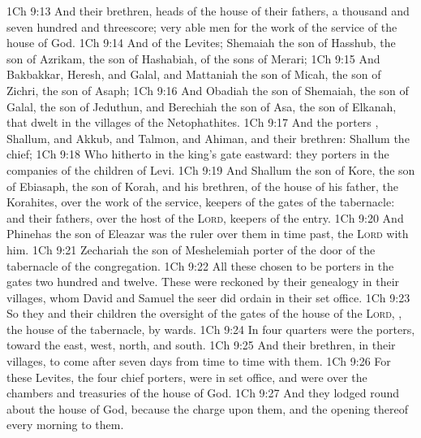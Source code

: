 \vs 1Ch 9:13 And their brethren, heads of the house of their fathers, a thousand and seven hundred and threescore; very able men for the work of the service of the house of God.
\vs 1Ch 9:14 And of the Levites; Shemaiah the son of Hasshub, the son of Azrikam, the son of Hashabiah, of the sons of Merari;
\vs 1Ch 9:15 And Bakbakkar, Heresh, and Galal, and Mattaniah the son of Micah, the son of Zichri, the son of Asaph;
\vs 1Ch 9:16 And Obadiah the son of Shemaiah, the son of Galal, the son of Jeduthun, and Berechiah the son of Asa, the son of Elkanah, that dwelt in the villages of the Netophathites.
\vs 1Ch 9:17 And the porters , Shallum, and Akkub, and Talmon, and Ahiman, and their brethren: Shallum  the chief;
\vs 1Ch 9:18 Who hitherto  in the king's gate eastward: they  porters in the companies of the children of Levi.
\vs 1Ch 9:19 And Shallum the son of Kore, the son of Ebiasaph, the son of Korah, and his brethren, of the house of his father, the Korahites,  over the work of the service, keepers of the gates of the tabernacle: and their fathers,  over the host of the \textsc{Lord},  keepers of the entry.
\vs 1Ch 9:20 And Phinehas the son of Eleazar was the ruler over them in time past,  the \textsc{Lord}  with him.
\vs 1Ch 9:21  Zechariah the son of Meshelemiah  porter of the door of the tabernacle of the congregation.
\vs 1Ch 9:22 All these  chosen to be porters in the gates  two hundred and twelve. These were reckoned by their genealogy in their villages, whom David and Samuel the seer did ordain in their set office.
\vs 1Ch 9:23 So they and their children  the oversight of the gates of the house of the \textsc{Lord}, , the house of the tabernacle, by wards.
\vs 1Ch 9:24 In four quarters were the porters, toward the east, west, north, and south.
\vs 1Ch 9:25 And their brethren,  in their villages,  to come after seven days from time to time with them.
\vs 1Ch 9:26 For these Levites, the four chief porters, were in  set office, and were over the chambers and treasuries of the house of God.
\vs 1Ch 9:27 And they lodged round about the house of God, because the charge  upon them, and the opening thereof every morning  to them.
